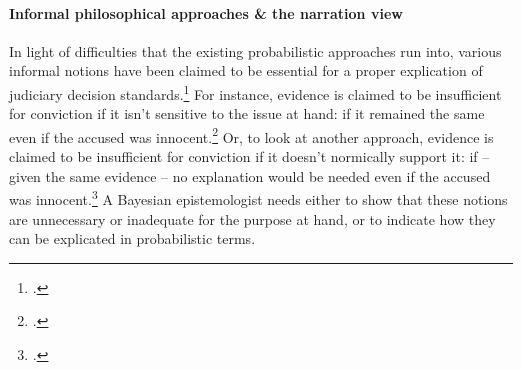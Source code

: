\documentclass[11pt, a4paper]{article}
\begin{document}



\vspace{-4mm}



\paragraph{Informal philosophical approaches \& the narration view}






 In light of difficulties that the existing probabilistic approaches  run into, various informal notions  have been claimed to be essential for  a proper explication of judiciary decision standards.\footcite{wells1992naked,haack2011legal,redmayne2008exploring} For instance,  evidence is claimed to be insufficient for conviction if it isn't sensitive to the issue at hand: if it remained the same even if the accused was innocent.\footcite{enoch2015sense} Or, to look at another approach,  evidence is claimed to be insufficient for conviction if it doesn't normically support it: if -- given the same evidence -- no explanation would be needed even if the accused was innocent.\footcite{Smith_conviction_mind_2017}   A Bayesian epistemologist needs either to show that these notions are  unnecessary or inadequate for the purpose at hand, or to indicate how they can be explicated in probabilistic terms. 
\end{document}
